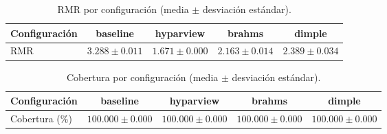 \begin{table}[h]
\centering
\caption{RMR por configuración (media $\pm$ desviación estándar).}
\begin{tabular}{lcccc}
\hline
Configuración & baseline & hyparview & brahms & dimple \\
\hline
RMR & $3.288 \pm 0.011$ & $1.671 \pm 0.000$ & $2.163 \pm 0.014$ & $2.389 \pm 0.034$ & \\
\hline
\end{tabular}
\end{table}

\begin{table}[h]
\centering
\caption{Cobertura por configuración (media $\pm$ desviación estándar).}
\begin{tabular}{lcccc}
\hline
Configuración & baseline & hyparview & brahms & dimple \\
\hline
Cobertura (\%) & $100.000 \pm 0.000$ & $100.000 \pm 0.000$ & $100.000 \pm 0.000$ & $100.000 \pm 0.000$ & \\
\hline
\end{tabular}
\end{table}
